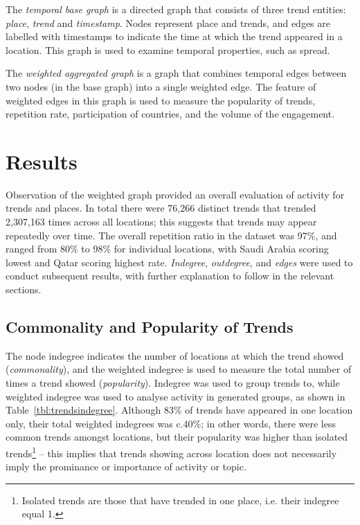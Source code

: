 \documentclass{llncs}
\begin{document}
The {\emph{temporal base graph}} is a directed graph that consists of
three trend entities: {\emph{place}}, {\emph{trend}} and
{\emph{timestamp}}. Nodes represent place and trends, and edges are
labelled with timestamps to indicate the time at which the trend
appeared in a location. This graph is used to examine temporal
properties, such as spread.

The {\emph{weighted aggregated graph}} is a graph that combines
temporal edges between two nodes (in the base graph) into a single
weighted edge. The feature of weighted edges in this graph is used to
measure the popularity of trends, repetition rate, participation of
countries, and the volume of the engagement.


\section{Results}\label{results}

Observation of the weighted graph provided an overall evaluation of
activity for trends and places. In total there were 76,266 distinct
trends that trended 2,307,163 times across all locations; this
suggests that trends may appear repeatedly over time. The overall
repetition ratio in the dataset was 97\%, and ranged from 80\% to 98\%
for individual locations, with Saudi Arabia scoring lowest and Qatar
scoring highest rate. {\emph{Indegree}}, {\emph{outdegree}}, and
{\emph{edges}} were used to conduct subsequent results, with further
explanation to follow in the relevant sections.

\subsection{Commonality and Popularity of Trends}

The node indegree indicates the number of locations at which the trend
showed ({\emph{commonality}}), and the weighted indegree is used to
measure the total number of times a trend showed
({\emph{popularity}}). Indegree was used to group trends to, while
weighted indegree was used to analyse activity in generated groups, as
shown in Table~\ref{tbl:trendsindegree}. Although 83\% of trends have
appeared in one location only, their total weighted indegrees was
c.40\%; in other words, there were less common trends amongst
locations, but their popularity was higher than isolated
trends\footnote{Isolated trends are those that have trended in one
place, i.e. their indegree equal 1.} -- this implies that trends
showing across location does not necessarily imply the prominance or
importance of activity or topic.
\end{document}

